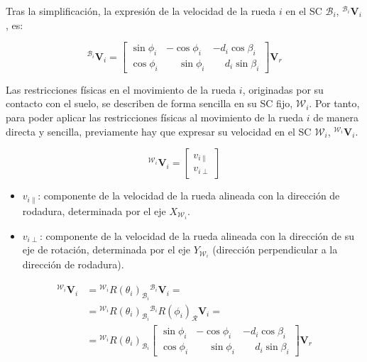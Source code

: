 \documentclass[11pt,a4paper]{article}
\newcommand{\vect}[1]{\bm{#1}}       %
\newcommand{\frameR}{\mathcal{R}}
\newcommand{\frameBi}{\mathcal{B}_i}
\newcommand{\frameWi}{\mathcal{W}_i}
\newcommand{\ejeXWi}{X_{\frameWi}}
\newcommand{\ejeYWi}{Y_{\frameWi}}
\begin{document}
Tras la simplificación, la expresión de la velocidad de la rueda \(i\) en el SC \(\frameBi\), \({}^{\frameBi} \vect{V}_i\), es:

\begin{equation}
    ^{\frameBi}\vect{V}_{i} = \begin{bmatrix}
        \sin\phi_i & -\cos\phi_i           & -d_i\cos\beta_i           \\
        \cos\phi_i & \phantom{-}\sin\phi_i & \phantom{-}d_i\sin\beta_i
    \end{bmatrix} \vect{V}_r
    \label{eq:wheel-velocity-frameBi_final}
\end{equation}

Las restricciones físicas en el movimiento de la rueda \(i\), originadas por su contacto con el suelo, se describen de forma sencilla en su SC fijo, \(\frameWi\). Por tanto, para poder aplicar las restricciones físicas al movimiento de la rueda \(i\) de manera directa y sencilla, previamente hay que expresar su velocidad en el SC \(\frameWi\), \({}^{\frameWi} \vect{V}_i\).

\begin{equation}
    {}^{\frameWi} \vect{V}_i = \begin{bmatrix} v_{i\parallel} \\ v_{i\perp} \end{bmatrix}
\end{equation}

\begin{itemize}
    \item \(v_{i\parallel}\): componente de la velocidad de la rueda alineada con la dirección de rodadura, determinada por el eje \(\ejeXWi\).
    \item \(v_{i\perp}\): componente de la velocidad de la rueda alineada con la dirección de su eje de rotación, determinada por el eje \(\ejeYWi\) (dirección perpendicular a la dirección de rodadura).
\end{itemize}

\begin{equation}
    \begin{aligned}
        {}^{\frameWi} \vect{V}_i & = {}^{\frameWi} R(\theta_i)_{\frameBi} {}^{\frameBi} \vect{V}_i =                                     \\
                                 & = {}^{\frameWi} R(\theta_i)_{\frameBi} {}^{\frameBi} R(\phi_i)_{\frameR} \vect{V}_i =                 \\
                                 & = {}^{\frameWi} R(\theta_i)_{\frameBi} \begin{bmatrix}
                                                                              \sin\phi_i & -\cos\phi_i           & -d_i\cos\beta_i           \\
                                                                              \cos\phi_i & \phantom{-}\sin\phi_i & \phantom{-}d_i\sin\beta_i
                                                                          \end{bmatrix} \vect{V}_r
    \end{aligned}
    \label{eq:wheel-velocity-frameWi}
\end{equation}
\end{document}
